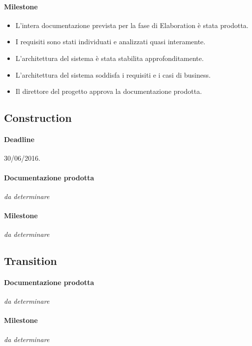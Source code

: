 \paragraph{Milestone}
\begin{itemize}
	\item L'intera documentazione prevista per la fase di Elaboration \`e stata prodotta.
	\item I requisiti sono stati individuati e analizzati quasi interamente.
	\item L'architettura del sistema \`e stata stabilita approfonditamente.
	\item L'architettura del sistema soddisfa i requisiti e i casi di business.
	\item Il direttore del progetto approva la documentazione prodotta.
\end{itemize}

\subsection{Construction}

\paragraph{Deadline}
30/06/2016.

\paragraph{Documentazione prodotta}
\emph{da determinare}

\paragraph{Milestone}
\emph{da determinare}


\subsection{Transition}

\paragraph{Documentazione prodotta}
\emph{da determinare}

\paragraph{Milestone}
\emph{da determinare}
